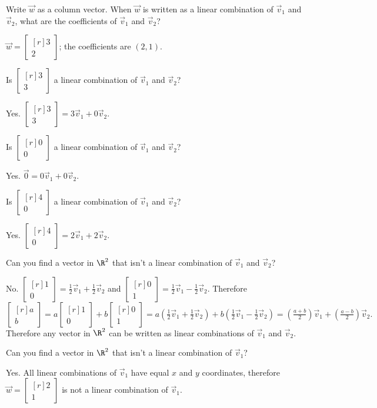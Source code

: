 \documentclass{problemset}
\newcommand{\mat}[1]{\begin{bmatrix*}[r]#1\end{bmatrix*}}
\begin{document}
	\begin{parts}
		\item Write $\vec w$ as a column vector. When $\vec w$ is written as a 
			linear combination of $\vec v_1$ and $\vec v_2$, what are the 
			coefficients of $\vec v_1$ and $\vec v_2$?
			\begin{solution}
				$\vec w=\mat{3\\2}$; the coefficients are $(2,1)$.
			\end{solution}
		\item Is $\mat{3\\3}$ a linear combination of $\vec v_1$ and $\vec v_2$?
			\begin{solution}[inline]
				Yes. $\mat{3\\3}=3\vec v_1+0\vec v_2$.
			\end{solution}

		\item Is $\mat{0\\0}$ a linear combination of $\vec v_1$ and $\vec v_2$?
			\begin{solution}[inline]
				Yes. $\vec 0=0\vec v_1+0\vec v_2$.
			\end{solution}
		\item Is $\mat{4\\0}$ a linear combination of $\vec v_1$ and $\vec v_2$?
			\begin{solution}[inline]
				Yes. $\mat{4\\0}=2\vec v_1+2\vec v_2$.
			\end{solution}
		\item Can you find a vector in $\R^2$ that isn't a linear combination of
		$\vec v_1$ and $\vec v_2$?
			\begin{solution}
				No. $\mat{1\\0}=\tfrac{1}{2}\vec v_1+\tfrac{1}{2}\vec v_2$ and
				$\mat{0\\1}=\tfrac{1}{2}\vec v_1-\tfrac{1}{2}\vec v_2$. 
				Therefore
				\[
					\mat{a\\b}
					= a\mat{1\\0}+b\mat{0\\1} 
					= a(\tfrac{1}{2}\vec v_1+\tfrac{1}{2}\vec v_2)
						+b(\tfrac{1}{2}\vec v_1-\tfrac{1}{2}\vec v_2)
					=(\tfrac{a+b}{2})\vec v_1+(\tfrac{a-b}{2})\vec v_2.
				\]
				Therefore any vector in $\R^2$ can be written as linear combinations
				of $\vec v_1$ and $\vec v_2$.
			\end{solution}
		\item Can you find a vector in $\R^2$ that isn't a linear combination of
			$\vec v_1$?
			\begin{solution}
				Yes. All linear combinations of $\vec v_1$ have equal $x$ and 
				$y$ coordinates, therefore $\vec w=\mat{2\\1}$ is not a linear 
				combination of $\vec v_1$.
			\end{solution}
	\end{parts}
\end{document}
